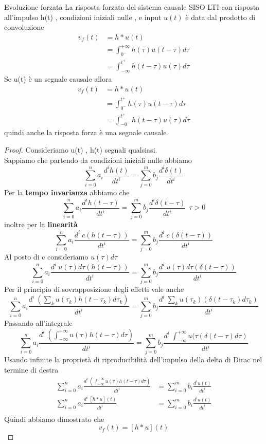 \documentclass{article}
\theoremstyle{definition}
\newcommand{\intinf}{\int_{-\infty}^{+\infty}}
\begin{document}
	\begin{teo}{Evoluzione forzata}{}
		La risposta forzata del sistema causale SISO LTI con risposta all'impulso h(t) , condizioni iniziali nulle , e input $u(t)$ è data dal prodotto di convoluzione 
	\begin{align*}
		v_f(t)&=h*u(t)\\
		&=\int_{0^-}^{+\infty}h(\tau)u(t-\tau) d\tau\\
		&=\int_{-\infty}^{t^+} h(t-\tau)u(\tau)d\tau
	\end{align*}
		Se u(t) è un segnale causale allora
			\begin{align*}
			v_f(t)&=h*u(t)\\
			&=\int_{0^-}^{t^+}h(\tau)u(t-\tau) d\tau\\
			&=\int_{-0^-}^{t^+} h(t-\tau)u(\tau)d\tau
		\end{align*}
		quindi anche la risposta forza è una segnale causale 
		\end{teo}
		\begin{proof}
			Consideriamo u(t) , h(t) segnali qualsiasi.\\
			Sappiamo che partendo da condizioni iniziali nulle abbiamo 
				$$\sum_{i=0}^{n}a_i \frac{d^i h(t)}{dt^i}=\sum_{j=0}^{m}b_j \frac{d^i \delta(t)}{dt^i} $$
				Per la \textbf{tempo invarianza }abbiamo che 
				$$\sum_{i=0}^{n}a_i \frac{d^i h(t-\tau)}{dt^i}=\sum_{j=0}^{m}b_j \frac{d^i \delta(t-\tau)}{dt^i}  \ \ \tau > 0$$
				inoltre per la \textbf{linearità}
				$$\sum_{i=0}^{n}a_i \frac{d^i \ c (h(t-\tau))}{dt^i}=\sum_{j=0}^{m}b_j \frac{d^i \ c(\delta(t-\tau))}{dt^i} $$
				Al posto di c consideriamo $u(\tau)d\tau$
					$$\sum_{i=0}^{n}a_i \frac{d^i \ u(\tau)d\tau (h(t-\tau))}{dt^i}=\sum_{j=0}^{m}b_j \frac{d^i \ u(\tau)d\tau(\delta(t-\tau))}{dt^i} $$
					Per il principio di sovrapposizione degli effetti vale anche 
						$$\sum_{i=0}^{n}a_i \frac{d^i \  (\sum_k u(\tau_k)h(t-\tau_k)d\tau_k)}{dt^i}=\sum_{j=0}^{m}b_j \frac{d^i \ \sum_k u(\tau_k)(\delta(t-\tau_k)d\tau_k)}{dt^i} $$
						Passando all'integrale 
						$$\sum_{i=0}^{n}a_i \frac{d^i \  (\intinf u(\tau)h(t-\tau)d\tau)}{dt^i}=\sum_{j=0}^{m}b_j \frac{d^i \ \intinf u(\tau(\delta(t-\tau)d\tau)}{dt^i} $$
						Usando infinite la proprietà di riproducibilità dell'impulso della delta di Dirac nel termine di destra 
						\begin{align*}
							\sum_{i=0}^{n}a_i \frac{d^i \  (\intinf u(\tau)h(t-\tau)d\tau)}{dt^i}&=\sum_{i=0}^{m}b_i \frac{d^iu(t)}{dt^i}\\
								\sum_{i=0}^{n}a_i \frac{d^i \  [h*u](t)}{dt^i}&=\sum_{i=0}^{m}b_i \frac{d^iu(t)}{dt^i}\\
						\end{align*}
						Quindi abbiamo dimostrato che $$v_f(t)=[h*u](t)$$
		\end{proof}
\end{document}
